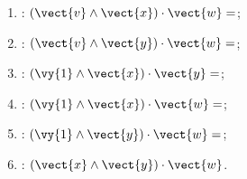 \begin{multicols}{2}
\begin{enumerate}
\item : $\left(\vect{v}\wedge\vect{x}\right)\cdot\vect{w} =$;
\item : $\left(\vect{v}\wedge\vect{y}\right)\cdot\vect{w} =$;
\item : $\left(\vy{1}\wedge\vect{x}\right)\cdot\vect{y} =$;
\item : $\left(\vy{1}\wedge\vect{x}\right)\cdot\vect{w} =$;
\item : $\left(\vy{1}\wedge\vect{y}\right)\cdot\vect{w} =$;
\item : $\left(\vect{x}\wedge\vect{y}\right)\cdot\vect{w}$.
\end{enumerate}
\end{multicols}



\ifprof
\else

\footnotesize

\normalsize



\fi
